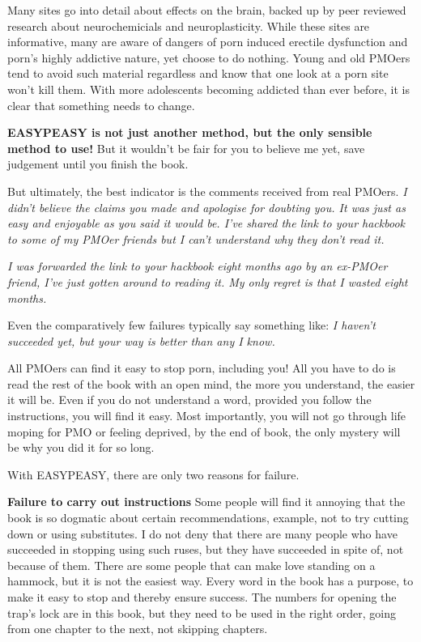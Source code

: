 \documentclass[easypeasy.tex]{subfiles}
\begin{document}
Many sites go into detail about effects on the brain, backed up by peer reviewed research about neurochemicials and neuroplasticity. While these sites are informative, many are aware of dangers of porn induced erectile dysfunction and porn's highly addictive nature, yet choose to do nothing. Young and old PMOers tend to avoid such material regardless and know that one look at a porn site won't kill them. With more adolescents becoming addicted than ever before, it is clear that something needs to change.

\textbf{EASYPEASY is not just another method, but the only sensible method to use!} But it wouldn't be fair for you to believe me yet, save judgement until you finish the book.

But ultimately, the best indicator is the comments received from real PMOers.
\textit{I didn't believe the claims you made and apologise for doubting you. It was just as easy and enjoyable as you said it would be. I've shared the link to your hackbook to some of my PMOer friends but I can't understand why they don't read it.}

\textit{I was forwarded the link to your hackbook eight months ago by an ex-PMOer friend, I've just gotten around to reading it. My only regret is that I wasted eight months.}

Even the comparatively few failures typically say something like:
\textit{I haven't succeeded yet, but your way is better than any I know.}

All PMOers can find it easy to stop porn, including you! All you have to do is read the rest of the book with an open mind, the more you understand, the easier it will be. Even if you do not understand a word, provided you follow the instructions, you will find it easy. Most importantly, you will not go through life moping for PMO or feeling deprived, by the end of book, the only mystery will be why you did it for so long.

With EASYPEASY, there are only two reasons for failure.

\textbf{Failure to carry out instructions}
Some people will find it annoying that the book is so dogmatic about certain recommendations, example, not to try cutting down or using substitutes. I do not deny that there are many people who have succeeded in stopping using such ruses, but they have succeeded in spite of, not because of them. There are some people that can make love standing on a hammock, but it is not the easiest way. Every word in the book has a purpose, to make it easy to stop and thereby ensure success. The numbers for opening the trap's lock are in this book, but they need to be used in the right order, going from one chapter to the next, not skipping chapters.
\end{document}

